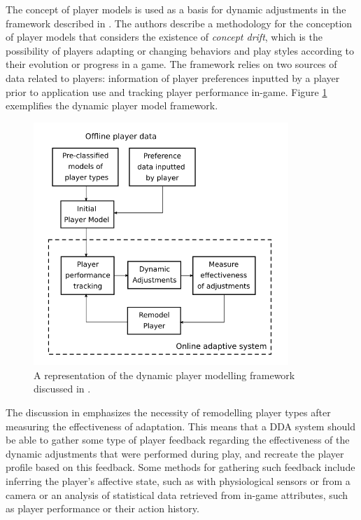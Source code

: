 The concept of player models is used as a basis for dynamic adjustments in the framework described in \cite{ARTICLE_DynamicPlayerModelling}. The authors describe a methodology for the conception of player models that considers the existence of \emph{concept drift}, which is the possibility of players adapting or changing behaviors and play styles according to their evolution or progress in a game. The framework relies on two sources of data related to players: information of player preferences inputted by a player prior to application use and tracking player performance in-game. Figure \ref{fig:dynamic-player-model} exemplifies the dynamic player model framework.

\begin{figure}[!ht]
    \caption{A representation of the dynamic player modelling framework discussed in \cite{ARTICLE_DynamicPlayerModelling}.}
    \begin{center}
        \includegraphics[width=26em]{figures/fig-dynamic-player-model.png}
    \end{center}
    \label{fig:dynamic-player-model}
\end{figure}

The discussion in \cite{ARTICLE_DynamicPlayerModelling} emphasizes the necessity of remodelling player types after measuring the effectiveness of adaptation. This means that a DDA system should be able to gather some type of player feedback regarding the effectiveness of the dynamic adjustments that were performed during play, and recreate the player profile based on this feedback. Some methods for gathering such feedback include inferring the player's affective state, such as with physiological sensors or from a camera or an analysis of statistical data retrieved from in-game attributes, such as player performance or their action history.

